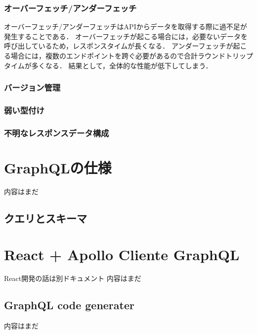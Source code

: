 \documentclass[11pt,a4paper]{jsarticle}
\begin{document}
\subsubsection{オーバーフェッチ/アンダーフェッチ}
オーバーフェッチ/アンダーフェッチはAPIからデータを取得する際に過不足が発生することである．
オーバーフェッチが起こる場合には，必要ないデータを呼び出しているため，レスポンスタイムが長くなる．
アンダーフェッチが起こる場合には，複数のエンドポイントを跨ぐ必要があるので合計ラウンドトリップタイムが多くなる．
結果として，全体的な性能が低下してしまう．
\subsubsection{バージョン管理}

\subsubsection{弱い型付け}

\subsubsection{不明なレスポンスデータ構成}


\section{GraphQLの仕様}
内容はまだ
\subsection{クエリとスキーマ}

\section{React + Apollo Cliente GraphQL}
React開発の話は別ドキュメント
内容はまだ

\subsection{GraphQL code generater}
内容はまだ
\end{document}
